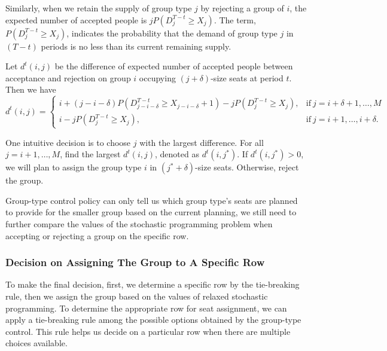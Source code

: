 Similarly, when we retain the supply of group type $j$ by rejecting a group of $i$, the expected number of accepted people is $j P(D_{j}^{T-t} \geq X_{j})$. The term, $P(D_{j}^{T-t} \geq X_{j})$, indicates the probability that the demand of group type $j$ in $(T-t)$ periods is no less than its current remaining supply.

Let $d^{t}(i,j)$ be the difference of expected number of accepted people between acceptance and rejection on group $i$ occupying $(j+\delta)$-size seats at period $t$. Then we have
\begin{equation*}
	d^{t}(i,j) = \begin{cases}
    i + (j-i-\delta)P(D_{j-i-\delta}^{T-t} \geq X_{j-i-\delta}+1) - j P(D_{j}^{T-t} \geq X_{j}), &\text{if}~ j = i+\delta+1, \ldots, M \\
    i - j P(D_{j}^{T-t} \geq X_{j}), &\text{if}~ j = i+1, \ldots, i+\delta.
		\end{cases}
\end{equation*}

One intuitive decision is to choose $j$ with the largest difference. For all $j = i+1, \ldots, M$, find the largest $d^{t}(i,j)$, denoted as $d^{t}(i,j^{*})$. If $d^{t}(i,j^{*}) >0$, we will plan to assign the group type $i$ in $(j^{*}+\delta)$-size seats. Otherwise, reject the group.

Group-type control policy can only tell us which group type's seats are planned to provide for the smaller group based on the current planning, we still need to further compare the values of the stochastic programming problem when accepting or rejecting a group on the specific row. 

\subsubsection{Decision on Assigning The Group to A Specific Row}
To make the final decision, first, we determine a specific row by the tie-breaking rule, then we assign the group based on the values of relaxed stochastic programming. To determine the appropriate row for seat assignment, we can apply a tie-breaking rule among the possible options obtained by the group-type control. This rule helps us decide on a particular row when there are multiple choices available. 

